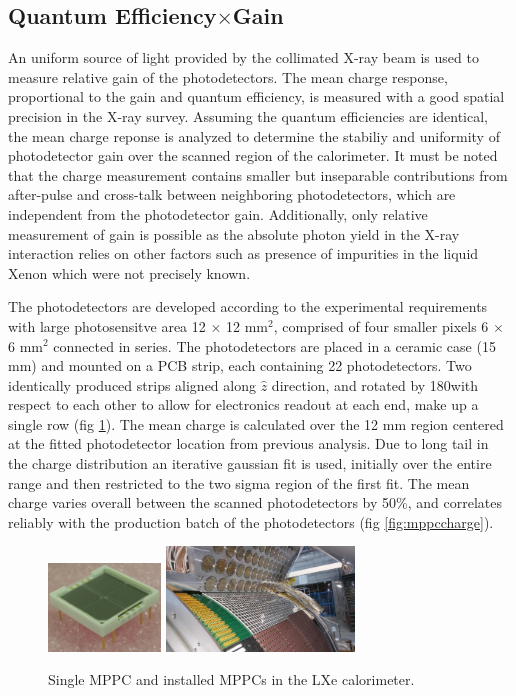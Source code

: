 \subsection{Quantum Efficiency$\times$Gain}
An uniform source of light provided by the collimated X-ray beam is
used to measure relative gain of the photodetectors.  The mean charge
response, proportional to the gain and quantum efficiency, is measured
with a good spatial precision in the X-ray survey.  Assuming the
quantum efficiencies are identical, the mean charge reponse is
analyzed to determine the stabiliy and uniformity of photodetector
gain over the scanned region of the calorimeter.  It must be noted
that the charge measurement contains smaller but inseparable
contributions from after-pulse and cross-talk between neighboring
photodetectors, which are independent from the photodetector gain.
Additionally, only relative measurement of gain is possible as the
absolute photon yield in the X-ray interaction relies on other factors
such as presence of impurities in the liquid Xenon which were not
precisely known. 


The photodetectors are developed according to the experimental
requirements with large photosensitve area 12 $\times$ 12 mm$^2$,
comprised of four  smaller pixels 6 $\times$ 6 mm$^2$ connected in
series.  The photodetectors are placed in a ceramic case (15 mm) and
mounted on a PCB strip, each containing 22 photodetectors.  Two
identically produced strips aligned along $\hat{z}$ direction, and
rotated by 180\degree with respect to each other to allow for
electronics readout at each end, make up a single row (fig 
\ref{fig:mppc}).
The mean charge  is calculated over the 12 mm region centered at the
fitted photodetector location from previous analysis.  Due to long
tail in the charge distribution an iterative gaussian fit is used,
initially over the entire range and then restricted to the two sigma
region of the first fit.  The mean charge varies overall between the
scanned photodetectors by 50\%, and correlates reliably with the
production batch of the photodetectors (fig \ref{fig:mppccharge}). 

\begin{figure}
\includegraphics[width=3cm]{plots/single_mppc.jpg}
\includegraphics[width=5cm]{plots/CFRP_spacer_MPPC.jpg}
\caption{Single MPPC and installed MPPCs in the LXe calorimeter.}
\label{fig:mppc} 
\end{figure}

